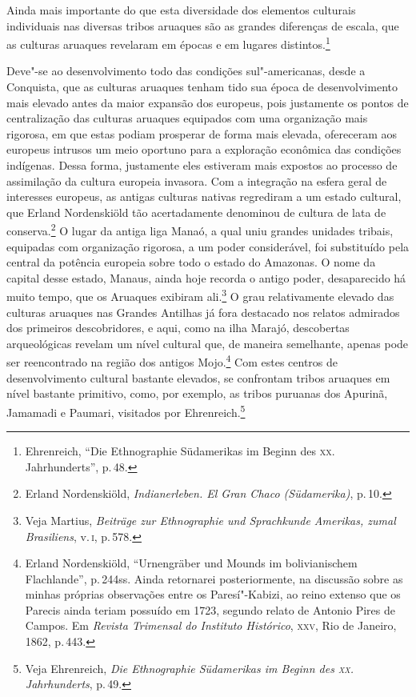 Ainda mais importante do que esta diversidade dos elementos culturais
individuais nas diversas tribos aruaques são as grandes diferenças de
escala, que as culturas aruaques revelaram em épocas e em lugares
distintos.\footnote{Ehrenreich, ``Die Ethnographie Südamerikas im Beginn
  des \textsc{xx}. Jahrhunderts'', p.\,48.}

Deve"-se ao desenvolvimento todo das condições sul"-americanas, desde a
Conquista, que as culturas aruaques tenham tido sua época de desenvolvimento
mais elevado antes da maior expansão dos europeus, pois justamente os
pontos de centralização das culturas aruaques equipados com uma
organização mais rigorosa, em que estas podiam prosperar de forma mais
elevada, ofereceram aos europeus intrusos um meio oportuno para a
exploração econômica das condições indígenas. Dessa forma, justamente
eles estiveram mais expostos ao processo de assimilação da cultura
europeia invasora. Com a integração na esfera geral de interesses
europeus, as antigas culturas nativas regrediram a um estado cultural,
que Erland Nordenskiöld tão acertadamente denominou de cultura de lata
de conserva.\footnote{Erland Nordenskiöld, \textit{Indianerleben. El Gran
  Chaco (Südamerika)}, p.\,10.} O lugar da antiga liga Manaó, a
qual uniu grandes unidades tribais, equipadas com organização rigorosa,
a um poder considerável, foi substituído pela central da potência
europeia sobre todo o estado do Amazonas. O nome da capital desse
estado, Manaus, ainda hoje recorda o antigo poder, desaparecido há muito
tempo, que os Aruaques exibiram ali.\footnote{Veja Martius, \textit{Beiträge
  zur Ethnographie und Sprachkunde Amerikas, zumal Brasiliens}, v.\,\textsc{i}, p.\,578.} O grau relativamente elevado das culturas aruaques nas Grandes
Antilhas já fora destacado nos relatos admirados dos primeiros
descobridores, e aqui, como na ilha Marajó, descobertas arqueológicas
revelam um nível cultural que, de maneira semelhante, apenas pode ser
reencontrado na região dos antigos Mojo.\footnote{Erland Nordenskiöld,
  ``Urnengräber und Mounds im bolivianischem Flachlande'', p.\,244ss. Ainda retornarei posteriormente, na discussão sobre as minhas
próprias observações entre os Paresí"-Kabizi, ao reino extenso que os
Parecis ainda teriam possuído em 1723, segundo relato de Antonio Pires
de Campos. Em \textit{Revista Trimensal do Instituto Histórico}, \textsc{xxv},
  Rio de Janeiro, 1862, p.\,443.} Com estes centros de desenvolvimento
cultural bastante elevados, se confrontam tribos aruaques em nível
bastante primitivo, como, por exemplo, as tribos puruanas dos Apurinã,
Jamamadi e Paumari, visitados por Ehrenreich.\footnote{Veja Ehrenreich,
  \textit{Die Ethnographie Südamerikas im Beginn des \textsc{xx}. Jahrhunderts}, p.\,49.}

